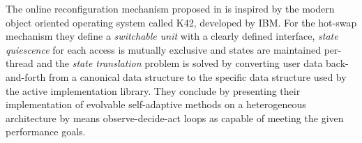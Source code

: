 The online reconfiguration mechanism proposed in \cite{evolvable} is inspired by the modern object oriented operating system called K42, developed by IBM. For the hot-swap mechanism they define a \emph{switchable unit} with a clearly defined interface, \emph{state quiescence} for each access is mutually exclusive and states are maintained per-thread and the \emph{state translation} problem is solved by converting user data back-and-forth from a canonical data structure to the specific data structure used by the active implementation library. They conclude by presenting their implementation of evolvable self-adaptive methods on a heterogeneous architecture by means observe-decide-act loops as capable of meeting the given performance goals. 

